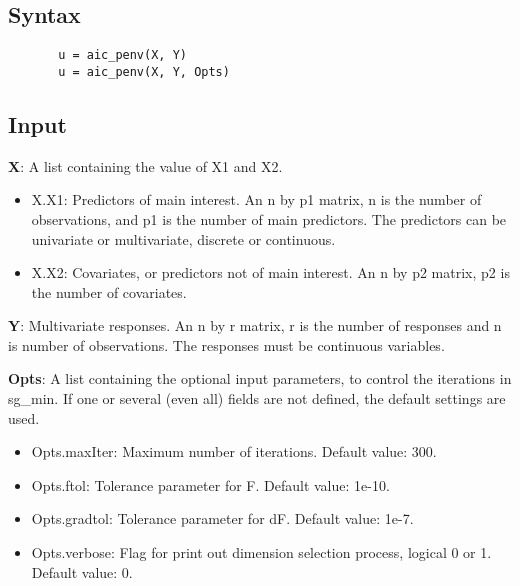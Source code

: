 \documentclass[a4paper,11pt,openany]{memoir}
\begin{document}
\subsection*{Syntax}


\begin{verbatim}       u = aic_penv(X, Y)
       u = aic_penv(X, Y, Opts)\end{verbatim}
    

\subsection*{Input}

\begin{par}
\textbf{X}: A list containing the value of X1 and X2.
\end{par} \vspace{1em}
\begin{itemize}
\setlength{\itemsep}{-1ex}
   \item X.X1: Predictors of main interest. An n by p1 matrix, n is the number of observations, and p1 is the number of main predictors. The predictors can be univariate or multivariate, discrete or continuous.
   \item X.X2: Covariates, or predictors not of main interest.  An n by p2 matrix, p2 is the number of covariates.
\end{itemize}
\begin{par}
\textbf{Y}: Multivariate responses. An n by r matrix, r is the number of responses and n is number of observations. The responses must be continuous variables.
\end{par} \vspace{1em}
\begin{par}
\textbf{Opts}: A list containing the optional input parameters, to control the iterations in sg\_min. If one or several (even all) fields are not defined, the default settings are used.
\end{par} \vspace{1em}
\begin{itemize}
\setlength{\itemsep}{-1ex}
   \item Opts.maxIter: Maximum number of iterations.  Default value: 300.
   \item Opts.ftol: Tolerance parameter for F.  Default value: 1e-10.
   \item Opts.gradtol: Tolerance parameter for dF.  Default value: 1e-7.
   \item Opts.verbose: Flag for print out dimension selection process, logical 0 or 1. Default value: 0.
\end{itemize}
\end{document}
